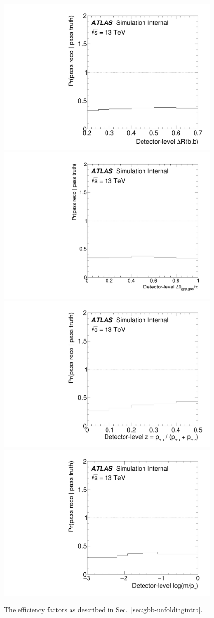 \begin{figure}[htpb!]
\begin{center}
  \includegraphics[width=0.45\linewidth]{figures/gbb/Unfolding/dR_effic_factor.pdf}
  \includegraphics[width=0.45\linewidth]{figures/gbb/Unfolding/dphi_effic_factor.pdf}\\
  \includegraphics[width=0.45\linewidth]{figures/gbb/Unfolding/ZpT_effic_factor.pdf}
  \includegraphics[width=0.45\linewidth]{figures/gbb/Unfolding/fracmasspt_effic_factor.pdf}
\caption[]{The efficiency factors as described in Sec.~\ref{sec:gbb-unfoldingintro}.} 
\label{fig:gbb-acceptance}
\end{center}
\end{figure}

